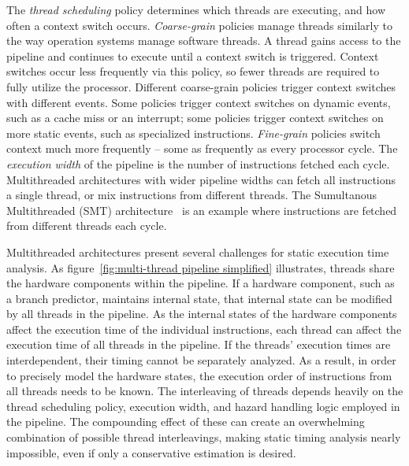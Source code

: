 The \emph{thread scheduling} policy determines which threads are executing, and how often a context switch occurs.  
\emph{Coarse-grain} policies manage threads similarly to the way operation systems manage software threads.
A thread gains access to the pipeline and continues to execute until a context switch is triggered.
Context switches occur less frequently via this policy, so fewer threads are required to fully utilize the processor.
Different coarse-grain policies trigger context switches with different events. 
Some policies trigger context switches on dynamic events, such as a cache miss or an interrupt; some policies trigger context switches on more static events, such as specialized instructions.
\emph{Fine-grain} policies switch context much more frequently -- some as frequently as every processor cycle.
The \emph{execution width} of the pipeline is the number of instructions fetched each cycle.  
Multithreaded architectures with wider pipeline widths can fetch all instructions a single thread, or mix instructions from different threads.
The Sumultanous Multithreaded (SMT) architecture~\cite{Tullsen1995SMT} is an example where instructions are fetched from different threads each cycle.

Multithreaded architectures present several challenges for static execution time analysis.
As figure~\ref{fig:multi-thread pipeline simplified} illustrates, threads share the hardware components within the pipeline.
If a hardware component, such as a branch predictor, maintains internal state, that internal state can be modified by all threads in the pipeline.
As the internal states of the hardware components affect the execution time of the individual instructions, each thread can affect the execution time of all threads in the pipeline. 
If the threads' execution times are interdependent, their timing cannot be separately analyzed.
As a result, in order to precisely model the hardware states, the execution order of instructions from all threads needs to be known.
The interleaving of threads depends heavily on the thread scheduling policy, execution width, and hazard handling logic employed in the pipeline.
The compounding effect of these can create an overwhelming combination of possible thread interleavings, making static timing analysis nearly impossible, even if only a conservative estimation is desired.   

